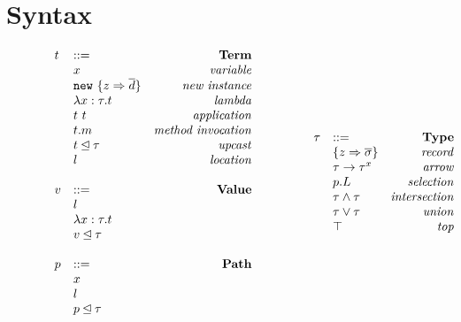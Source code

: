 \documentclass{llncs}
\numberwithin{subcase}{case}
\numberwithin{case}{theorem}
\numberwithin{case}{lemma}
\begin{document}
\section{Syntax}

\begin{figure}[h]
\[
\begin{array}{lllll}
\begin{array}{llr}
t 		& ::= 														&\text{\bf{Term}} \\
		& x 														&\text{\emph{variable}}\\
		& \texttt{new} \ \{z \Rightarrow \overline{d}\}	&\text{\emph{new instance}}\\
		& \lambda x:\tau.t 										&\text{\emph{lambda}}\\
		& t\ t 													&\text{\emph{application}}\\
		& t.m 														&\text{\emph{method invocation}}\\
		& t \unlhd \tau 										&\text{\emph{upcast}}\\
		& l  														&\text{\emph{location}}\\
&&\\
v 		& ::= 														&\text{\bf{Value}} \\
		& l 														&\\
		& \lambda x:\tau.t										&\\
		& v \unlhd \tau 										&\\
&&\\
p 		& ::= 														&\text{\bf{Path}} \\
		& x 														&\\
		& l 														&\\
		& p \unlhd \tau 										&\\
 \end{array}
& ~~~~~~
&
\begin{array}{llr}
\tau 	& ::= 														&\text{\bf{Type}} \\
		& \{z \Rightarrow \overline{\sigma}\}				&\text{\emph{record}}\\
		& \tau \rightarrow \tau^x 							&\text{\emph{arrow}}\\
		& p.L 														&\text{\emph{selection}}\\
		& \tau \wedge \tau 										&\text{\emph{intersection}}\\
		& \tau \vee \tau 										&\text{\emph{union}}\\
		& \top 													&\text{\emph{top}}\\

\end{array}
\end{array}\]
\end{figure}
\end{document}
